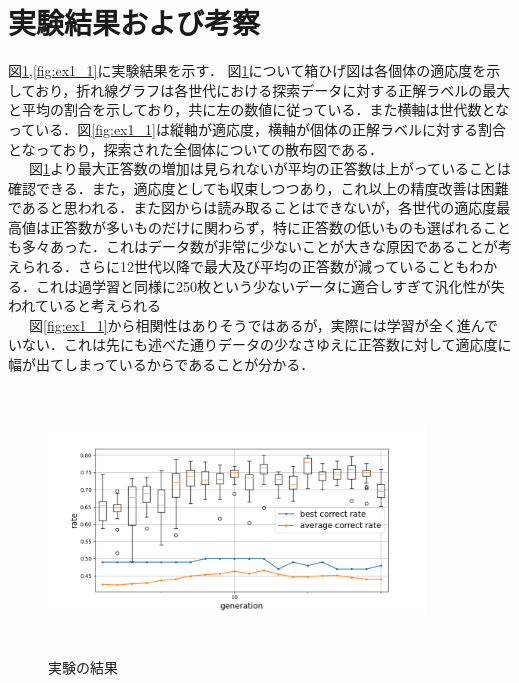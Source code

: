 \documentclass[twocolumn]{jarticle}     %
\begin{document}
\begin{table}[h]
	\centering
	\caption{GAの設定\label{tb:GApara}}
\end{table}

\section{実験結果および考察}
図\ref{fig:ex1},\ref{fig:ex1_1}に実験結果を示す．
図\ref{fig:ex1}について箱ひげ図は各個体の適応度を示しており，折れ線グラフは各世代における探索データに対する正解ラベルの最大と平均の割合を示しており，共に左の数値に従っている．また横軸は世代数となっている．図\ref{fig:ex1_1}は縦軸が適応度，横軸が個体の正解ラベルに対する割合となっており，探索された全個体についての散布図である．\\
\ \ \ 図\ref{fig:ex1}より最大正答数の増加は見られないが平均の正答数は上がっていることは確認できる．また，適応度としても収束しつつあり，これ以上の精度改善は困難であると思われる．また図からは読み取ることはできないが，各世代の適応度最高値は正答数が多いものだけに関わらず，特に正答数の低いものも選ばれることも多々あった．これはデータ数が非常に少ないことが大きな原因であることが考えられる．さらに12世代以降で最大及び平均の正答数が減っていることもわかる．これは過学習と同様に250枚という少ないデータに適合しすぎて汎化性が失われていると考えられる\\
\ \ \ 図\ref{fig:ex1_1}から相関性はありそうではあるが，実際には学習が全く進んでいない．これは先にも述べた通りデータの少なさゆえに正答数に対して適応度に幅が出てしまっているからであることが分かる．\\ 
\begin{figure}[h]
	\begin{center}
		\vspace*{-3mm}
		\hspace*{-8mm}
		\includegraphics[height=70mm,width=100mm]{graph.png}
		\caption{実験の結果\label{fig:ex1}}
	\end{center}
\end{figure}
\end{document}
